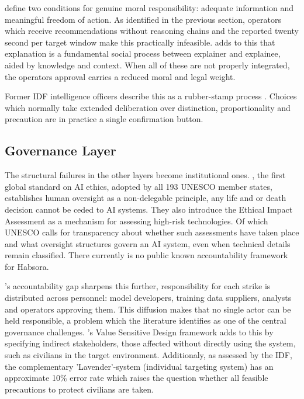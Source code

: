 \citet{mhcof} define two conditions for genuine moral responsibility: adequate information and meaningful freedom of action. As identified in the previous section, operators which receive recommendations without reasoning chains and the reported twenty second per target window \citep{abraham_2024} make this practically infeasible. \citet{miller2018explanationartificialintelligenceinsights} adds to this that explanation is a fundamental social process between explainer and explainee, aided by knowledge and context. When all of these are not properly integrated, the operators approval carries a reduced moral and legal weight.

Former IDF intelligence officers describe this as a rubber-stamp process \citep{abraham_2024, kozlovski2024algorithms}. Choices which normally take extended deliberation over distinction, proportionality and precaution are in practice a single confirmation button.

\subsection{Governance Layer}
The structural failures in the other layers become institutional ones. \citet{unesco2021recommendation}, the first global standard on AI ethics, adopted by all 193 UNESCO member states, establishes human oversight as a non-delegable principle, any life and or death decision cannot be ceded to AI systems. They also introduce the Ethical Impact Assessment as a mechanism for assessing high-risk technologies. Of which UNESCO calls for transparency about whether such assessments have taken place and what oversight structures govern an AI system, even when technical details remain classified. There currently is no public known accountability framework for Habsora.

\citet{aimag.v40i1.2848}'s accountability gap sharpens this further, responsibility for each strike is distributed across personnel: model developers, training data suppliers, analysts and operators approving them. This diffusion makes that no single actor can be held responsible, a problem which the literature identifies as one of the central governance challenges. \citet{friedman2013vsd}'s Value Sensitive Design framework adds to this by specifying indirect stakeholders, those affected without directly using the system, such as civilians in the target environment. Additionaly, as assessed by the IDF, the complementary 'Lavender'-system (individual targeting system) has an approximate 10\% error rate which raises the question whether all feasible precautions to protect civilians are taken.


